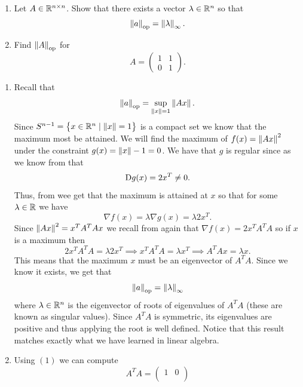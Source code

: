 \documentclass[11pt,a4paper]{article}
\begin{document}
\begin{exercise} \phantom{}
  \begin{enumerate}
    \item[(1)] Let $A \in \mathbb{R}^{n \times n}$.
      Show that there exists a vector $\lambda \in \mathbb{R}^n$ so that
      \[
        \left\lVert a\right\rVert_{\operatorname{op}} = \left\lVert\lambda\right\rVert_{\infty}.
      \]
    \item[(2)] Find $\left\lVert A\right\rVert_{\operatorname{op}}$ for
      \[
        A = 
        \begin{pmatrix}
          1 & 1 \\
          0 & 1
        \end{pmatrix}.
      \]
  \end{enumerate}
\end{exercise}
\begin{solution} \phantom{}
  \begin{enumerate}
    \item[(1)] Recall that
      \[
        \left\lVert a\right\rVert_{\operatorname{op}} = \sup_{\left\lVert x\right\rVert = 1} \left\lVert Ax\right\rVert.
      \]
      Since $S^{n-1} = \left\{x \in \mathbb{R}^{n} \mid \left\lVert x\right\rVert = 1\right\}$ is a compact set
      we know that the maximum most be attained.
      We will find the maximum of $f(x) = \left\lVert Ax\right\rVert^2$ under
      the constraint $g(x) = \left\lVert x\right\rVert - 1 = 0$.
      We have that $g$ is regular since as we know from 
      that
      \[
        \mathrm{D} g(x) = 2x^T \neq 0.
      \]
      Thus, from  wee get that the maximum
      is attained at $x$ so that for some $\lambda \in \mathbb{R}$ we have
      \[
        \nabla f(x) = \lambda \nabla g(x) = \lambda 2x^T.
      \]
      Since $\left\lVert Ax\right\rVert^{2} = x^T A^T A x$ we recall from 
      again that $\nabla f(x) = 2x^T A^T A$ so if $x$ is a maximum then
      \[
        2x^T A^T A = \lambda 2x^T \implies
        x^T A^T A = \lambda x^T \implies
         A^T A x = \lambda x.
      \]
      This means that the maximum $x$ must be an eigenvector of $A^T A$.
      Since we know it exists, we get that
      \[
        \left\lVert a\right\rVert_{\operatorname{op}} = \left\lVert\lambda\right\rVert_{\infty}
      \]
      where $\lambda \in \mathbb{R}^n$ is the eigenvector of roots of eigenvalues
      of $A^T A$ (these are known as singular values).
      Since $A^T A$ is symmetric, its eigenvalues are positive and thus
      applying the root is well defined.
      Notice that this result matches exactly what we have learned
      in linear algebra.
    \item[(2)] Using $(1)$ we can compute
      \[
        A^T A =
        \begin{pmatrix}
          1 & 0 \\

\end{pmatrix}\]
\end{enumerate}
\end{solution}
\end{document}
